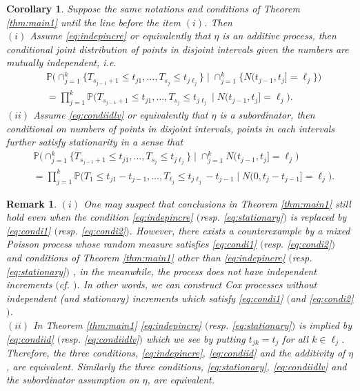 \documentclass[11pt,leqno%
]{amsart}
\newtheorem{corollary}[lemma]{Corollary}
\newtheorem{remark}[lemma]{Remark}
\renewcommand{\P }{{\mathbb P}}
\newcommand{\1}{{\mathbf 1}}
\begin{document}
\begin{corollary}
\label{corollary:main1}
 Suppose the same notations and conditions of Theorem \ref{thm:main1}
 until the line before the item $(i)$. Then\\
 $(i)$ Assume \eqref{eq:indepincre} or equivalently that $\eta$ is an
 additive process, then conditional joint distribution of points in
 disjoint intervals given the numbers are mutually independent, i.e. 
\begin{align}
 \label{eq:condi1}
 & \P\big(
 \cap_{j=1}^k \{T_{s_{j-1}+1} \le t_{j1},\ldots,T_{s_j} \le
 t_{j\ell_j}\} \mid \cap_{j=1}^k \{N(t_{j-1},t_j] =\ell_j \}
 \big)\\
 & = \prod_{j=1}^k \P\big(
 T_{s_{j-1}+1}\le t_{j1},\ldots,T_{s_j}\le t_{j\ell_j}  \mid
 N(t_{j-1},t_j]=\ell_j  \big). \nonumber
\end{align}
$(ii)$ Assume \eqref{eq:condiidlv} or equivalently that $\eta$ is a subordinator, then
 conditional on numbers of points in disjoint intervals, 
 points in each intervals further satisfy stationarity in a sense that 
 \begin{align}
\label{eq:condi2}
 & \P\big(
 \cap_{j=1}^k \{T_{s_{j-1}+1} \le t_{j1},\ldots,T_{s_j} \le
 t_{j\ell_j}\} \mid \cap_{j=1}^k N(t_{j-1},t_j] =\ell_j 
 \big)\\
 & = \prod_{j=1}^k \P\big(
 T_{1} \le t_{j1}-t_{j-1},\ldots,T_{\ell_j}\le t_{j\ell_j}-t_{j-1} \mid
 N(0,t_j-t_{j-1}]=\ell_j  \big). \nonumber
\end{align}
\end{corollary}

\begin{remark}
 \label{rem:orderstatistics}
 $(i)$ One may suspect that conclusions in Theorem \ref{thm:main1} still
 hold even when the
 condition \eqref{eq:indepincre} $($resp. \eqref{eq:stationary}$)$ is
 replaced by \eqref{eq:condi1} $($resp. \eqref{eq:condi2}$)$. However, there
 exists a counterexample by a mixed Poisson process whose random
 measure satisfies \eqref{eq:condi1} $($resp. \eqref{eq:condi2}$)$ and conditions of Theorem \ref{thm:main1} other than
 \eqref{eq:indepincre} $($resp. \eqref{eq:stationary}$)$%
 , in the meanwhile, the
 process does not have independent increments $($cf. \cite[Appendix A]{matsui:rolski:2016}$)$. In other words, we can
 construct Cox processes without independent (and stationary) increments
 which satisfy \eqref{eq:condi1} $($and \eqref{eq:condi2}$)$. \\
 $(ii)$ In Theorem \ref{thm:main1} \eqref{eq:indepincre} $($resp. \eqref{eq:stationary}$)$
  is implied by \eqref{eq:condiid} $($resp. \eqref{eq:condiidlv}$)$
  which we see by putting $t_{jk}=t_j$ for all $k\in\ell_j$. Therefore,
 the three conditions,  
 \eqref{eq:indepincre}, \eqref{eq:condiid} and the additivity of $\eta$, are
 equivalent. Similarly the three conditions, \eqref{eq:stationary}, \eqref{eq:condiidlv}
 and the subordinator assumption on $\eta$, are equivalent. 
\end{remark}
\end{document}
